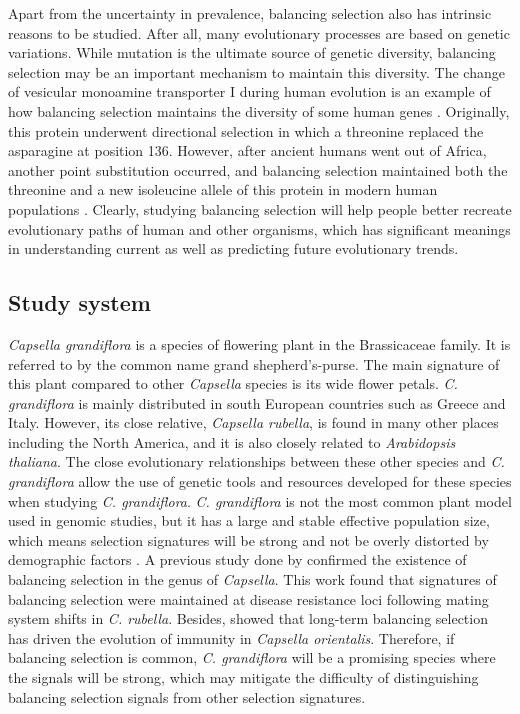 Apart from the uncertainty in prevalence, balancing selection also has intrinsic reasons to be studied. After all, many evolutionary processes are based on genetic variations. While mutation is the ultimate source of genetic diversity, balancing selection may be an important mechanism to maintain this diversity. The change of vesicular monoamine transporter I during human evolution is an example of how balancing selection maintains the diversity of some human genes \citep{RN4}. Originally, this protein underwent directional selection in which a threonine replaced the asparagine at position 136. However, after ancient humans went out of Africa, another point substitution occurred, and balancing selection maintained both the threonine and a new isoleucine allele of this protein in modern human populations \citep{RN4}. Clearly, studying balancing selection will help people better recreate evolutionary paths of human and other organisms, which has significant meanings in understanding current as well as predicting future evolutionary trends.

\subsection{Study system}
\emph{Capsella grandiflora} is a species of flowering plant in the Brassicaceae family. It is referred to by the common name grand shepherd's-purse. The main signature of this plant compared to other \emph{Capsella} species is its wide flower petals. \emph{C. grandiflora} is mainly distributed in south European countries such as Greece and Italy. However, its close relative, \emph{Capsella rubella}, is found in many other places including the North America, and it is also closely related to \emph{Arabidopsis thaliana}. The close evolutionary relationships between these other species and \emph{C. grandiflora} allow the use of genetic tools and resources developed for these species when studying \emph{C. grandiflora}. \emph{C. grandiflora} is not the most common plant model used in genomic studies, but it has a large and stable effective population size, which means selection signatures will be strong and not be overly distorted by demographic factors \citep{RN6}. A previous study done by \citet{RN7} confirmed the existence of balancing selection in the genus of \emph{Capsella}. This work found that signatures of balancing selection were maintained at disease resistance loci following mating system shifts in \emph{C. rubella}. Besides, \citet{RN8} showed that long-term balancing selection has driven the evolution of immunity in \emph{Capsella orientalis}. Therefore, if balancing selection is common, \emph{C. grandiflora} will be a promising species where the signals will be strong, which may mitigate the difficulty of distinguishing balancing selection signals from other selection signatures.

